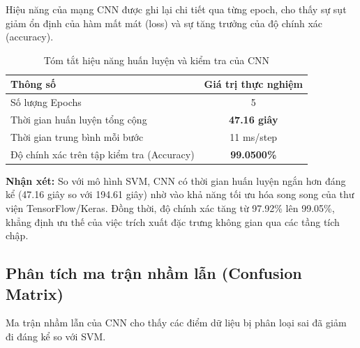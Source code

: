 \documentclass[../DoAn.tex]{subfiles}
\begin{document}
Hiệu năng của mạng CNN được ghi lại chi tiết qua từng epoch, cho thấy sự sụt giảm ổn định của hàm mất mát (loss) và sự tăng trưởng của độ chính xác (accuracy).

\begin{table}[H]
\centering
\caption{Tóm tắt hiệu năng huấn luyện và kiểm tra của CNN}
\label{tab:cnn_general_perf}
\begin{tabular}{|l|c|}
\hline
\textbf{Thông số} & \textbf{Giá trị thực nghiệm} \\ \hline
Số lượng Epochs & 5 \\ \hline
Thời gian huấn luyện tổng cộng & \textbf{47.16 giây} \\ \hline
Thời gian trung bình mỗi bước & 11 ms/step \\ \hline
Độ chính xác trên tập kiểm tra (Accuracy) & \textbf{99.0500\%} \\ \hline
\end{tabular}
\end{table}

\textbf{Nhận xét:} So với mô hình SVM, CNN có thời gian huấn luyện ngắn hơn đáng kể (47.16 giây so với 194.61 giây) nhờ vào khả năng tối ưu hóa song song của thư viện TensorFlow/Keras. Đồng thời, độ chính xác tăng từ 97.92\% lên 99.05\%, khẳng định ưu thế của việc trích xuất đặc trưng không gian qua các tầng tích chập.\\

\subsection{Phân tích ma trận nhầm lẫn (Confusion Matrix)}

Ma trận nhầm lẫn của CNN cho thấy các điểm dữ liệu bị phân loại sai đã giảm đi đáng kể so với SVM.
\end{document}

